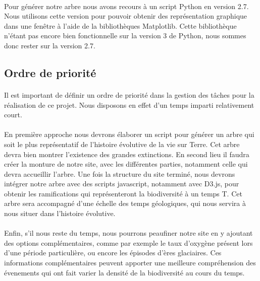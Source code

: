 \documentclass[a4paper]{article}
\begin{document}
		\paragraph{}
		Pour générer notre arbre nous avons recours à un script Python en version 2.7. Nous utilisons cette version pour pouvoir obtenir des représentation graphique dans une fenêtre à l'aide de la bibliothèques Matplotlib. Cette bibliothèque n'étant pas encore bien fonctionnelle sur la version 3 de Python, nous sommes donc rester sur la version 2.7.
	
	\subsection{Ordre de priorité}
		\paragraph{}
		Il est important de définir un ordre de priorité dans la gestion des tâches pour la réalisation de ce projet. Nous disposons en effet d'un temps imparti relativement court.

		\paragraph{}
		En première approche nous devrons élaborer un script pour générer un arbre qui soit le plus représentatif de l'histoire évolutive de la vie sur Terre. Cet arbre devra bien montrer l'existence des grandes extinctions. 
		En second lieu il faudra créer la monture de notre site, avec les différentes parties, notamment celle qui devra accueillir l'arbre. 
		Une fois la structure du site terminé, nous devrons intégrer notre arbre avec des scripts javascript, notamment avec D3.js, pour obtenir les ramifications qui représenteront la biodiversité à un temps T. Cet arbre sera accompagné d'une échelle des temps géologiques, qui nous servira à nous situer dans l'histoire évolutive.

		\paragraph{}
		Enfin, s'il nous reste du temps, nous pourrons peaufiner notre site en y ajoutant des options complémentaires, comme par exemple le taux d'oxygène présent lors d'une période particulière, ou encore les épisodes d'ères glaciaires. Ces informations complémentaires peuvent apporter une meilleure compréhension des évenements qui ont fait varier la densité de la biodiversité au cours du temps.
\end{document}
